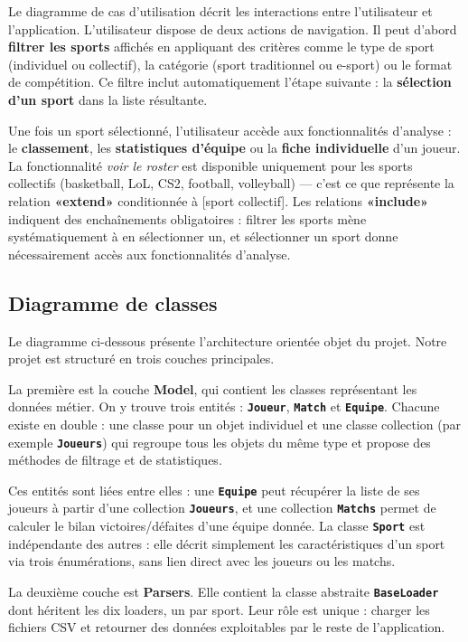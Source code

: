 \documentclass[12pt,a4paper]{article}
\newcommand{\classe}[1]{\texttt{\textbf{#1}}}
\begin{document}
Le diagramme de cas d'utilisation décrit les interactions entre l'utilisateur et
l'application. L'utilisateur dispose de deux actions de navigation. Il peut d'abord
\textbf{filtrer les sports} affichés en appliquant des critères comme le type de sport
(individuel ou collectif), la catégorie (sport traditionnel ou e-sport) ou le format de
compétition. Ce filtre inclut automatiquement l'étape suivante : la \textbf{sélection d'un
sport} dans la liste résultante.

Une fois un sport sélectionné, l'utilisateur accède aux fonctionnalités d'analyse : le
\textbf{classement}, les \textbf{statistiques d'équipe} ou la \textbf{fiche individuelle}
d'un joueur. La fonctionnalité \textit{voir le roster} est disponible uniquement pour les
sports collectifs (basketball, LoL, CS2, football, volleyball) --- c'est ce que représente
la relation \textbf{«extend»} conditionnée à [sport collectif]. Les relations
\textbf{«include»} indiquent des enchaînements obligatoires : filtrer les sports mène
systématiquement à en sélectionner un, et sélectionner un sport donne nécessairement
accès aux fonctionnalités d'analyse.

\subsection{Diagramme de classes}

Le diagramme ci-dessous présente l'architecture orientée objet du projet. Notre projet
est structuré en trois couches principales.

La première est la couche \textbf{Model}, qui contient les classes représentant les données
métier. On y trouve trois entités : \classe{Joueur}, \classe{Match} et \classe{Equipe}.
Chacune existe en double : une classe pour un objet individuel et une classe collection
(par exemple \classe{Joueurs}) qui regroupe tous les objets du même type et propose
des méthodes de filtrage et de statistiques.

Ces entités sont liées entre elles : une \classe{Equipe} peut récupérer la liste de ses
joueurs à partir d'une collection \classe{Joueurs}, et une collection \classe{Matchs}
permet de calculer le bilan victoires/défaites d'une équipe donnée. La classe \classe{Sport}
est indépendante des autres : elle décrit simplement les caractéristiques d'un sport via
trois énumérations, sans lien direct avec les joueurs ou les matchs.

La deuxième couche est \textbf{Parsers}. Elle contient la classe abstraite
\classe{BaseLoader} dont héritent les dix loaders, un par sport. Leur rôle est unique :
charger les fichiers CSV et retourner des données exploitables par le reste de
l'application.
\end{document}
